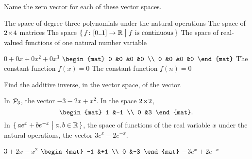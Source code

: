 \begin{exercises}
  \item 
    Name the zero vector for each of these vector spaces.
    \begin{exparts}
      \partsitem The space of degree three polynomials under the natural
        operations
      \partsitem The space of \( 2 \! \times \! 4 \) matrices
      \partsitem The space
        \( \mbox{$\{\,\mbox{$f\colon [0..1]\to \mathbb{R}$}\bigm| f\text{ is continuous}\,\}$} \)
      \partsitem The space of real-valued functions of one natural 
        number variable
    \end{exparts}
    \begin{answer}
      \begin{exparts}
        \partsitem \( 0+0x+0x^2+0x^3 \)
        \partsitem \( \begin{mat}
                   0  &0  &0  &0  \\
                   0  &0  &0  &0
                 \end{mat} \)
        \partsitem The constant function \( f(x)=0 \)
        \partsitem The constant function \( f(n)=0 \)
      \end{exparts}  
    \end{answer}
  \recommended \item
    Find the additive inverse, in the vector space,
    of the vector.
    \begin{exparts}
      \partsitem In \( \mathcal{P}_3 \), the vector \( -3-2x+x^2 \).
      \partsitem In the space \( 2 \! \times \! 2 \),
        \begin{equation*}
          \begin{mat}
            1  &-1  \\
            0  &3
          \end{mat}.
        \end{equation*}
     \partsitem In \( \mbox{$\{\,ae^x+be^{-x}\bigm| a,b\in\mathbb{R}\,\}$} \), the space 
       of functions of the real variable \( x \) under the natural operations,
       the vector \( 3e^x-2e^{-x} \).
    \end{exparts}
    \begin{answer}
      \begin{exparts*}
        \partsitem \( 3+2x-x^2 \)
        \partsitem \( \begin{mat}
                   -1  &+1  \\
                    0  &-3
                 \end{mat} \)
        \partsitem \( -3e^x+2e^{-x} \)
      \end{exparts*}  

\end{answer}
\end{exercises}

